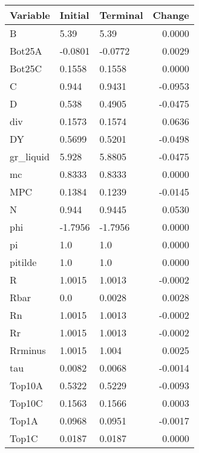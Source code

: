 \begin{table}
\centering
\label{tab:stst_comparison_end_L_wedge_permanent}
\begin{tabular}{lllr}
\toprule
                Variable & Initial & Terminal &  Change \\
\midrule
                       B &    5.39 &     5.39 &  0.0000 \\
                  Bot25A & -0.0801 &  -0.0772 &  0.0029 \\
                  Bot25C &  0.1558 &   0.1558 &  0.0000 \\
                       C &   0.944 &   0.9431 & -0.0953 \\
                       D &   0.538 &   0.4905 & -0.0475 \\
                     div &  0.1573 &   0.1574 &  0.0636 \\
                      DY &  0.5699 &   0.5201 & -0.0498 \\
               gr\_liquid &   5.928 &   5.8805 & -0.0475 \\
                      mc &  0.8333 &   0.8333 &  0.0000 \\
                     MPC &  0.1384 &   0.1239 & -0.0145 \\
                       N &   0.944 &   0.9445 &  0.0530 \\
                     phi & -1.7956 &  -1.7956 &  0.0000 \\
                      pi &     1.0 &      1.0 &  0.0000 \\
                 pitilde &     1.0 &      1.0 &  0.0000 \\
                       R &  1.0015 &   1.0013 & -0.0002 \\
                    Rbar &     0.0 &   0.0028 &  0.0028 \\
                      Rn &  1.0015 &   1.0013 & -0.0002 \\
                      Rr &  1.0015 &   1.0013 & -0.0002 \\
                 Rrminus &  1.0015 &    1.004 &  0.0025 \\
                     tau &  0.0082 &   0.0068 & -0.0014 \\
                  Top10A &  0.5322 &   0.5229 & -0.0093 \\
                  Top10C &  0.1563 &   0.1566 &  0.0003 \\
                   Top1A &  0.0968 &   0.0951 & -0.0017 \\
                   Top1C &  0.0187 &   0.0187 &  0.0000 \\

\end{tabular}
\end{table}
